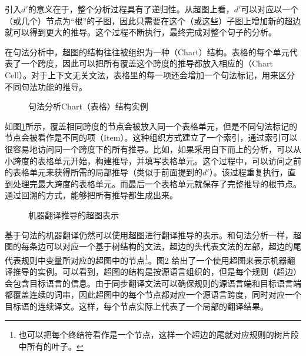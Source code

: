 \parinterval 引入$d'$的意义在于，整个分析过程具有了递归性。从超图上看，$d'$可以对应以一个（或几个）节点为“根”的子图，因此只需要在这个（或这些）子图上增加新的超边就可以得到更大的推导。这个过程不断执行，最终完成对整个句子的分析。

\parinterval 在句法分析中，超图的结构往往被组织为一种{\small{}}（Chart）结构。表格的每个单元代表了一个跨度，因此可以把所有覆盖这个跨度的推导都放入相应的{\small{}}（Chart Cell）。对于上下文无关文法，表格里的每一项还会增加一个句法标记，用来区分不同句法功能的推导。

\begin{figure}[htp]
\centering

\caption{句法分析Chart（表格）结构实例}
\label{fig:8-38}
\end{figure}

\parinterval 如图\ref{fig:8-38}所示，覆盖相同跨度的节点会被放入同一个表格单元，但是不同句法标记的节点会被看作是不同的项（Item）。这种组织方式建立了一个索引，通过索引可以很容易地访问同一个跨度下的所有推导。比如，如果采用自下而上的分析，可以从小跨度的表格单元开始，构建推导，并填写表格单元。这个过程中，可以访问之前的表格单元来获得所需的局部推导（类似于前面提到的$d'$）。该过程重复执行，直到处理完最大跨度的表格单元。而最后一个表格单元就保存了完整推导的根节点。通过回溯的方式，能够把所有推导都生成出来。

\begin{figure}[htp]
\centering

\caption{机器翻译推导的超图表示}
\label{fig:8-39}
\end{figure}

\parinterval 基于句法的机器翻译仍然可以使用超图进行翻译推导的表示。和句法分析一样，超图的每条边可以对应一个基于树结构的文法，超边的头代表文法的左部，超边的尾代表规则中变量所对应的超图中的节点\footnote[10]{ 也可以把每个终结符看作是一个节点，这样一个超边的尾就对应规则的树片段中所有的叶子。}。图\ref{fig:8-39} 给出了一个使用超图来表示机器翻译推导的实例。可以看到，超图的结构是按源语言组织的，但是每个规则（超边）会包含目标语言的信息。由于同步翻译文法可以确保规则的源语言端和目标语言端都覆盖连续的词串，因此超图中的每个节点都对应一个源语言跨度，同时对应一个目标语的连续译文。这样，每个节点实际上代表了一个局部的翻译结果。

